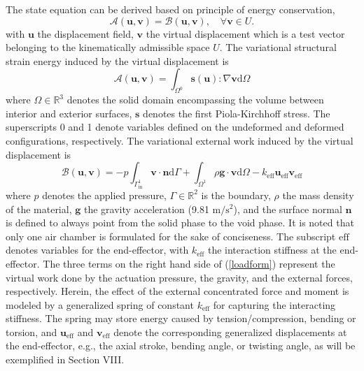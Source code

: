 \documentclass[journal]{IEEEtran}
\renewcommand{\vec}[1]{\mathbf{#1}}
\theoremstyle{definition}
\renewcommand{\vec}[1]{\mathbf{#1}}
\begin{document}
The state equation can be derived based on principle of energy conservation,
\begin{equation}\label{govern}
  \mathcal{A}(\vec{u}, \vec{v})=\mathcal{B}(\vec{u}, \vec{v}), \quad \forall \vec{v} \in U.
\end{equation}
with $\vec{u}$ the displacement field, $\vec{v}$ the virtual displacement which is a test vector belonging to the kinematically admissible space $U$. The variational structural strain energy induced by the virtual displacement is
\begin{equation}\label{structural}
  \mathcal{A}(\vec{u}, \vec{v})=\int_{\Omega^{0}} \vec{s}(\vec{u}): \nabla\vec{v} \mathrm{d} \Omega
\end{equation}
where $\Omega\in\mathbb{R}^3$ denotes the solid domain encompassing the volume between interior and exterior surfaces, $\vec{s}$ denotes the first Piola-Kirchhoff stress. The superscripts 0 and 1 denote variables defined on the undeformed and deformed configurations, respectively. The variational external work induced by the virtual displacement is
\begin{equation}
  \mathcal{B}(\vec{u}, \vec{v})=-p \int_{\Gamma_{\text{in}}^{1}} \vec{v} \cdot\vec{n}  \mathrm{d} \Gamma
  +\int_{\Omega^{1}} \rho\mathbf{g}\cdot\mathbf{v}\mathrm{d}\Omega - k_\text{eff}\vec{u}_\text{eff}\vec{v}_\text{eff}
  \label{loadform}
\end{equation}
where $p$ denotes the applied pressure, $\Gamma\in\mathbb{R}^2$ is the boundary, $\rho$ the mass density of the material, $\vec{g}$ the gravity acceleration (9.81 $\text{m}/\text{s}^2$), and the surface normal $\vec{n}$ is defined to always point from the solid phase to the void phase. It is noted that only one air chamber is formulated for the sake of conciseness. The subscript $\text{eff}$ denotes variables for the end-effector, with $k_\text{eff}$ the interaction stiffness at the end-effector. The three terms on the right hand side of (\ref{loadform}) represent the virtual work done by the actuation pressure, the gravity, and the external forces, respectively. Herein, the effect of the external concentrated force and moment is modeled by a generalized spring of constant $k_\text{eff}$ for capturing the interacting stiffness. The spring may store energy caused by tension/compression, bending or torsion, and $\vec{u}_\text{eff}$ and $\vec{v}_\text{eff}$ denote the corresponding generalized displacements at the end-effector, e.g., the axial stroke, bending angle, or twisting angle, as will be exemplified in Section VIII.
\end{document}
